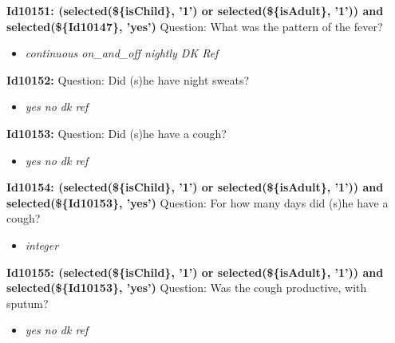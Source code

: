 \documentclass{article}%
\begin{document}
\textbf{Id10151: (selected(\$\{isChild\}, '1') or selected(\$\{isAdult\}, '1')) and selected(\$\{Id10147\}, 'yes')\newline%
}%
Question: What was the pattern of the fever?\newline%
%
\begin{itemize}%
\item%
\textit{continuous\newline%
 on\_and\_off\newline%
 nightly\newline%
 DK\newline%
 Ref\newline%
}%
\end{itemize}%
\textbf{Id10152: \newline%
}%
Question: Did (s)he have night sweats?\newline%
%
\begin{itemize}%
\item%
\textit{yes\newline%
 no\newline%
 dk\newline%
 ref\newline%
}%
\end{itemize}%
\textbf{Id10153: \newline%
}%
Question: Did (s)he have a cough?\newline%
%
\begin{itemize}%
\item%
\textit{yes\newline%
 no\newline%
 dk\newline%
 ref\newline%
}%
\end{itemize}%
\textbf{Id10154: (selected(\$\{isChild\}, '1') or selected(\$\{isAdult\}, '1')) and selected(\$\{Id10153\}, 'yes')\newline%
}%
Question: For how many days did (s)he have a cough?\newline%
%
\begin{itemize}%
\item%
\textit{integer\newline%
}%
\end{itemize}%
\textbf{Id10155: (selected(\$\{isChild\}, '1') or selected(\$\{isAdult\}, '1')) and selected(\$\{Id10153\}, 'yes')\newline%
}%
Question: Was the cough productive, with sputum?\newline%
%
\begin{itemize}%
\item%
\textit{yes\newline%
 no\newline%
 dk\newline%
 ref\newline%
}%
\end{itemize}%
\end{document}
